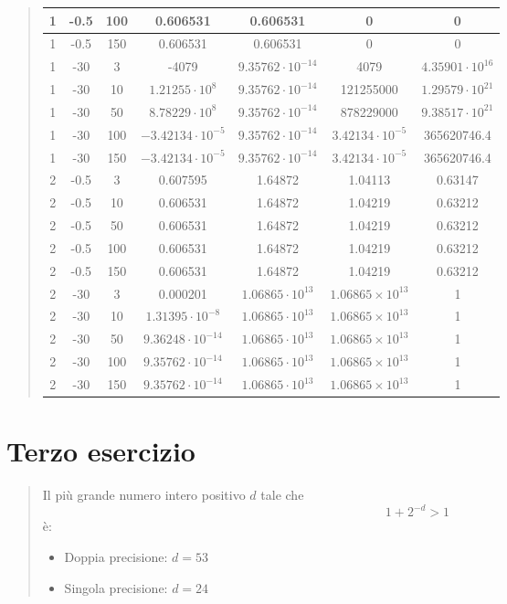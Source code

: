 \documentclass[12pt]{article}
\begin{document}
\begin{quote}
\begin{tabular}{| c | c | c | c | c | c | c |}
        1 & -0.5 & 100 & 0.606531 & 0.606531 & 0 & 0 \\
        \hline
        1 & -0.5 & 150 & 0.606531 & 0.606531 & 0 & 0 \\
        \hline
        1 & -30 & 3 & -4079 & $9.35762\cdot10^{-14}$ & 4079 & $4.35901\cdot10^{16}$ \\
        \hline
        1 & -30 & 10 & $1.21255\cdot10^{8}$ & $9.35762\cdot10^{-14}$ & 121255000 & $1.29579\cdot10^{21}$ \\
        \hline
        1 & -30 & 50 & $8.78229\cdot10^{8}$ & $9.35762\cdot10^{-14}$ & 878229000 & $9.38517\cdot10^{21}$ \\
        \hline
        1 & -30 & 100 & $-3.42134\cdot10^{-5}$ & $9.35762\cdot10^{-14}$ & $3.42134\cdot10^{-5}$ & 365620746.4\\
        \hline
        1 & -30 & 150 & $-3.42134\cdot10^{-5}$ & $9.35762\cdot10^{-14}$ & $3.42134\cdot10^{-5}$ & 365620746.4 \\
        \hline
        2 & -0.5 & 3 & 0.607595 & 1.64872 & 1.04113 & 0.63147 \\
        \hline
        2 & -0.5 & 10 & 0.606531 & 1.64872 & 1.04219 & 0.63212 \\
        \hline
        2 & -0.5 & 50 & 0.606531 & 1.64872 & 1.04219 & 0.63212 \\
        \hline
        2 & -0.5 & 100 & 0.606531 & 1.64872 & 1.04219 & 0.63212 \\
        \hline
        2 & -0.5 & 150 & 0.606531 & 1.64872 & 1.04219 & 0.63212 \\
        \hline
        2 & -30 & 3 & 0.000201 & $1.06865\cdot10^{13}$ & $1.06865\times10^{13}$ & 1 \\
        \hline
        2 & -30 & 10 & $1.31395\cdot10^{-8}$ & $1.06865\cdot10^{13}$ & $1.06865\times10^{13}$ & 1 \\
        \hline
        2 & -30 & 50 & $9.36248\cdot10^{-14}$ & $1.06865\cdot10^{13}$ & $1.06865\times10^{13}$ & 1 \\
        \hline
        2 & -30 & 100 & $9.35762\cdot10^{-14}$ & $1.06865\cdot10^{13}$ & $1.06865\times10^{13}$ & 1 \\
        \hline
        2 & -30 & 150 & $9.35762\cdot10^{-14}$ & $1.06865\cdot10^{13}$ & $1.06865\times10^{13}$ & 1 \\
        \hline
    \end{tabular}
\end{quote}
\newpage
\section{Terzo esercizio}
\begin{quote}
    Il più grande numero intero positivo $d$ tale che \begin{equation*}
        1+2^{-d} > 1
    \end{equation*}
    è:
    \begin{itemize}
        \item Doppia precisione: $d=53$
        \item Singola precisione: $d=24$
    \end{itemize}
\end{quote}
\end{document}

